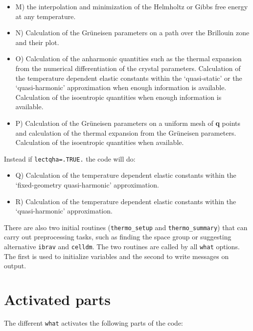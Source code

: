 \documentclass[12pt,a4paper,twoside]{report}
\begin{document}
\begin{itemize}

\item
M) the interpolation and minimization of the 
Helmholtz or Gibbs free energy at any temperature.

\item
N) Calculation of the Gr\"uneisen parameters on a path over the Brillouin
zone and their plot.

\item
O) Calculation of the anharmonic quantities such as the thermal expansion
from the numerical differentiation of the crystal parameters. 
Calculation of the temperature dependent elastic constants within 
the `quasi-static' or the `quasi-harmonic' approximation when enough 
information is available. Calculation of the isoentropic quantities when 
enough information is available. 

\item
P) Calculation of the Gr\"uneisen parameters on a uniform mesh of {\bf q} 
points and calculation of the thermal expansion from the Gr\"uneisen parameters.
Calculation of the isoentropic quantities when available.
\end{itemize}

Instead if \texttt{lectqha=.TRUE.} the code will do:
\begin{itemize}
\item
Q) Calculation of the temperature dependent elastic constants within the
`fixed-geometry quasi-harmonic' approximation.

\item
R) Calculation of the temperature dependent elastic constants within the
`quasi-harmonic' approximation.


\end{itemize}
There are also two initial routines (\texttt{thermo\_setup} and 
\texttt{thermo\_summary}) that can carry out preprocessing tasks, such as 
finding the space group or suggesting alternative \texttt{ibrav} and 
\texttt{celldm}. The two routines are called by all \texttt{what} options.
The first is used to initialize variables and the second to write messages 
on output.

\newpage

{\color{dark-blue}\chapter{Activated parts}}
\color{black}

The different \texttt{what} activates the following parts of the code:
\end{document}
